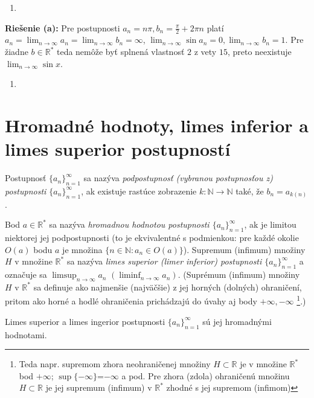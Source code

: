 \begin{enumerate}[resume]
	\item {}
\end{enumerate}

\textbf{Riešenie (a):}
Pre postupnosti $a_n=n\pi,b_n=\frac{\pi}{2}+2\pi n$ platí $a_n=\lim_{n \rightarrow \infty} a_n=\lim_{n \rightarrow \infty} b_n=\infty$, $\lim_{n \rightarrow \infty} \sin a_n=0,\lim_{n \rightarrow \infty} b_n=1$. Pre žiadne $b \in \mathbb{R^*}$ teda nemôže byť splnená vlastnosť $2$ z vety $15$, preto neexistuje $\lim_{n \rightarrow \infty} \sin x$.

\begin{enumerate}[resume]
	\item {}
\end{enumerate}

\section{Hromadné hodnoty, limes inferior a limes superior postupností}

Postupnosť ${\{a_n\}}_{n=1}^\infty$ sa nazýva \textit{podpostupnosť (vybranou postupnosťou z) postupnosti ${\{a_n\}}_{n=1}^\infty$}, ak existuje rastúce zobrazenie $k: \mathbb{N} \rightarrow \mathbb{N}$ také, že $b_n=a_{k(n)}$. 

Bod $a \in \mathbb{R^*}$ sa nazýva \textit{hromadnou hodnotou postupnosti ${\{a_n\}}_{n=1}^\infty$}, ak je limitou niektorej jej podpostupnosti (to je ekvivalentné s podmienkou: pre každé okolie $O(a)$ bodu $a$ je množina $\{n \in \mathbb{N}: a_n \in O(a) \}$). Supremum (infimum) množiny $H$ v množine $\mathbb{R^*}$ sa nazýva \textit{limes superior (limer inferior) postupnosti ${\{a_n\}}_{n=1}^\infty$} a označuje sa $\limsup_{n \rightarrow \infty} a_n$ $(\liminf_{n \rightarrow \infty} a_n)$. (Suprémum (infimum) množiny $H$ v $\mathbb{R^*}$ sa definuje ako najmenšie (najväčšie) z jej horných (dolných) ohraničení, pritom ako horné a hodlé ohraničenia prichádzajú do úvahy aj body $+\infty,-\infty$ \footnote{Teda napr. supremom zhora neohraničenej množiny $H \subset \mathbb{R}$ je v množine $\mathbb{R^*}$ bod $+\infty$; $\sup\{ -\infty\}$=$-\infty$ a pod. Pre zhora (zdola) ohraničenú množinu $H \subset \mathbb{R}$ je jej supremum (infimum) v $\mathbb{R^*}$ zhodné s jej supremom (infimom)}.)

\begin{veta}
Limes superior a limes ingerior postupnosti ${\{a_n\}}_{n=1}^\infty$ sú jej hromadnými hodnotami.
\end{veta}

